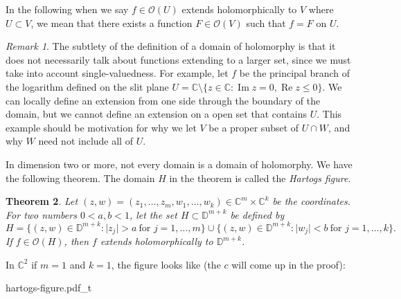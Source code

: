 \documentclass[12pt,openany]{book}
\renewcommand{\Re}{\operatorname{Re}}
\renewcommand{\Im}{\operatorname{Im}}
\newcommand{\sabs}[1]{\lvert {#1} \rvert}
\newcommand{\C}{{\mathbb{C}}}
\newcommand{\D}{{\mathbb{D}}}
\newcommand{\sO}{{\mathscr{O}}}
\newcommand{\myindex}[1]{#1\index{#1}}
\theoremstyle{plain}
\newtheorem{thm}{Theorem}[section]
\theoremstyle{remark}
\newtheorem{remark}[thm]{Remark}
\theoremstyle{definition}
\newenvironment{myfig}{%
    \begin{center}
}{%
    \end{center}
}
\theoremstyle{exercise}
\theoremstyle{example}
\begin{document}
In the following when we say $f \in \sO(U)$ extends holomorphically to $V$ where
$U \subset V$, we mean that there
exists a function $F \in \sO(V)$ such that $f = F$ on
$U$.

\begin{remark}
The subtlety of the definition of a domain of holomorphy is that it does not
necessarily talk about functions extending to a larger set, since we must
take into account single-valuedness.  For example, let $f$ be the principal branch
of the logarithm defined on the slit plane
$U = \C \setminus \{ z \in \C : \Im z = 0, \Re z \leq 0 \}$.
We can locally define an extension from one side through the boundary
of the domain, but we cannot define an extension on a open set that
contains $U$.  This example should be motivation for why we let $V$ 
be a proper subset of $U \cap W$, and why $W$ need not include all of $U$.
\end{remark}

In dimension two or more, not every domain is a domain of holomorphy.  We have
the following theorem.  The domain $H$ in the theorem is called the
\emph{\myindex{Hartogs figure}}.

\begin{thm} \label{thm:extensionhartogsfigure}
Let $(z,w) = (z_1,\ldots,z_m,w_{1},\ldots,w_{k}) \in \C^m \times \C^k$ be the coordinates.  For two numbers
$0 < a,b < 1$, let the set $H \subset \D^{m+k}$
be defined by
\begin{equation*}
H = \bigl\{ (z,w) \in \D^{m+k} : \sabs{z_j} > a ~\text{for $j=1,\ldots,m$}
\bigr\} \cup
\bigl\{ (z,w) \in \D^{m+k} : \sabs{w_j} < b ~\text{for $j=1,\ldots,k$}
\bigr\} .
\end{equation*}
If $f \in \sO(H)$, then $f$ extends holomorphically to $\D^{m+k}$.
\end{thm}

\begin{samepage}
In $\C^2$ if $m=1$ and $k=1$, the figure looks like (the $c$ will come up in
the proof):

\newcommand{\hartogstext}{\parbox[t]{2.3in}{In diagrams, the Hartogs figure is
often drawn as:}}

\begin{myfig}
{hartogs-figure.pdf_t}
\end{myfig}
\end{samepage}
\end{document}

